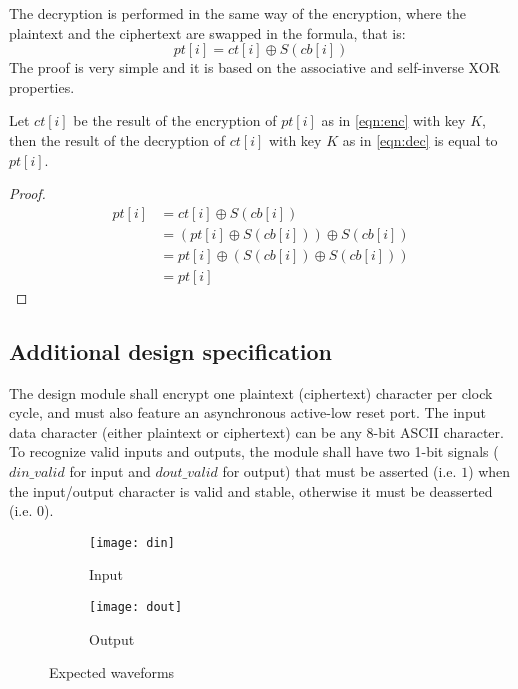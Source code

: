 The decryption is performed in the same way of the encryption, where the plaintext and the ciphertext are swapped in the formula, that is:
\begin{equation}
    \label{eqn:dec}
    pt[i] = ct[i] \oplus S(cb[i])
\end{equation}
The proof is very simple and it is based on the associative and self-inverse XOR properties.

\begin{theorem}
    Let $ct[i]$ be the result of the encryption of $pt[i]$ as in \cref{eqn:enc} with key $K$, then the result of the decryption of $ct[i]$ with key $K$ as in \cref{eqn:dec} is equal to $pt[i]$.
\end{theorem}

\begin{proof}
    \begin{align*}
        pt[i] & = ct[i] \oplus S(cb[i])                                \\
              & = \left(pt[i] \oplus S(cb[i]) \right) \oplus S(cb[i])  \\
              & = pt[i] \oplus \left(S(cb[i])  \oplus S(cb[i]) \right) \\
              & = pt[i]
    \end{align*}
\end{proof}

\subsection{Additional design specification}
The design module shall encrypt one plaintext (ciphertext) character per clock cycle, and must also feature an asynchronous active-low reset port.
The input data character (either plaintext or ciphertext) can be any 8-bit ASCII character.
To recognize valid inputs and outputs, the module shall have two 1-bit signals ($din\_valid$ for input and $dout\_valid$ for output) that must be asserted (i.e. $1$) when the input/output character is valid and stable, otherwise it must be deasserted (i.e. $0$).

\begin{figure}
    \centering
    \begin{subfigure}{.95\textwidth}
        \centering
        \texttt{[image: din]}
        \caption{Input}
        \label{fig:input_expected_waveform}
        \vspace*{.6cm}
    \end{subfigure}
    \begin{subfigure}{.95\textwidth}
        \centering
        \texttt{[image: dout]}
        \caption{Output}
        \label{fig:output_expected_waveform}
    \end{subfigure}
    \caption{Expected waveforms}
    \label{fig:expected_waveforms}
\end{figure}
